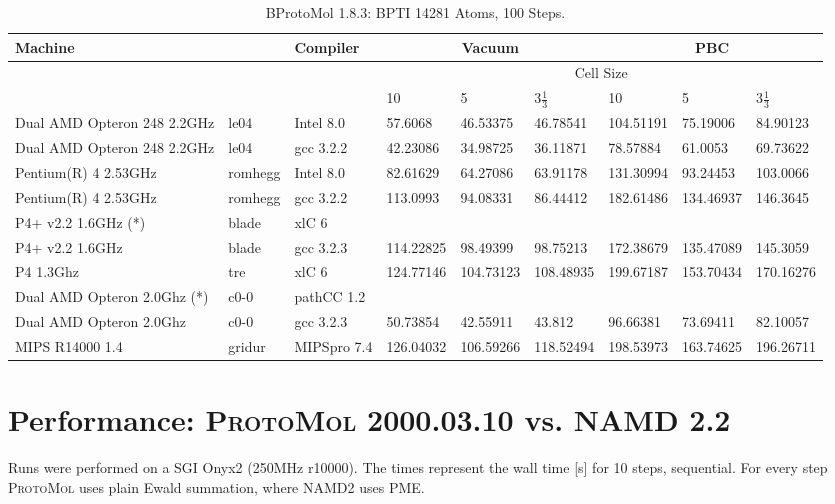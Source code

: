 \documentclass[11pt]{article}
\begin{document}
\begin{table}[htb]
\small
  \begin{center}
    \begin{tabular}{|p{1.7cm}|l|l|l|l|l|l|l|l|}\hline
\multicolumn{2}{|l|}{Machine}  & Compiler & \multicolumn{3}{|c|}{Vacuum} & \multicolumn{3}{|c|}{PBC} \\\hline
 \multicolumn{3}{|c|}{}  & \multicolumn{6}{|c|}{Cell Size} \\\hline
 \multicolumn{3}{|c|}{} & 10 & 5 & 3$\frac{1}{3}$ & 10 & 5 & 3$\frac{1}{3}$\\\hline
Dual AMD Opteron 248 2.2GHz & le04 & Intel 8.0 & 57.6068 & 46.53375 & 46.78541 & 104.51191 & 75.19006 & 84.90123\\\hline
Dual AMD Opteron 248 2.2GHz & le04 & gcc 3.2.2 & 42.23086 & 34.98725 & 36.11871 & 78.57884 & 61.0053 & 69.73622\\\hline
Pentium(R) 4 2.53GHz & romhegg & Intel 8.0 & 82.61629 & 64.27086 & 63.91178 & 131.30994 & 93.24453 & 103.0066\\\hline
Pentium(R) 4 2.53GHz & romhegg & gcc 3.2.2 & 113.0993 & 94.08331 & 86.44412 & 182.61486 & 134.46937 & 146.3645\\\hline
P4+ v2.2 1.6GHz (*) & blade & xlC 6 &  &  &  &  &  & \\\hline
P4+ v2.2 1.6GHz & blade & gcc 3.2.3 & 114.22825 & 98.49399 & 98.75213 & 172.38679 & 135.47089 & 145.3059\\\hline
P4 1.3Ghz & tre & xlC 6 & 124.77146 & 104.73123 & 108.48935 & 199.67187 & 153.70434 & 170.16276\\\hline
Dual AMD Opteron 2.0Ghz (*) & c0-0 & pathCC 1.2 &  &  &  &  &  & \\\hline
Dual AMD Opteron 2.0Ghz & c0-0 & gcc 3.2.3 & 50.73854 & 42.55911 & 43.812 & 96.66381 & 73.69411 & 82.10057\\\hline
MIPS R14000 1.4 & gridur & MIPSpro 7.4 & 126.04032 & 106.59266 & 118.52494 & 198.53973 & 163.74625 & 196.26711\\\hline
    \end{tabular}
  \end{center}
  \caption{BProtoMol 1.8.3: BPTI 14281 Atoms, 100 Steps.}
\end{table}

\clearpage

\section{Performance: \textsc{ProtoMol} 2000.03.10 vs. \textsc{NAMD 2.2}}
Runs were performed on a SGI Onyx2 (250MHz r10000). The times represent the
wall time [s] for 10 steps, sequential. For every step \textsc{ProtoMol} uses plain
Ewald summation, where \textsc{NAMD2} uses PME. 
\end{document}
